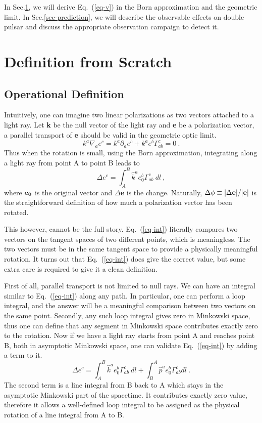 \documentclass[aps,showpacs,onecolumn,floats,prd,superscriptaddress,nofootinbib]{revtex4}
\begin{document}
In Sec.\ref{sec-born}, we will derive Eq.~(\ref{eq-v}) in the Born approximation and the geometric limit. In Sec.\ref{sec-prediction}, we will describe the observable effects on double pulsar and discuss the appropriate observation campaign to detect it.

\section{Definition from Scratch}
\label{sec-born}

\subsection{Operational Definition}

Intuitively, one can imagine two linear polarizations as two vectors attached to a light ray. Let {\bf k} be the null vector of the light ray and {\bf e} be a polarization vector, a parallel transport of {\bf e} should be valid in the geometric optic limit.
\begin{equation}
k^a \nabla_a e^c = k^a \partial_a e^c + k^a e^b \Gamma_{ab}^c =0~.
\end{equation}
Thus when the rotation is small, using the Born approximation, integrating along a light ray from point A to point B leads to
\begin{equation}
\Delta e^c = \int_A^B \hat{k}^a e_0^b \Gamma_{ab}^c~dl~,
\label{eq-int}
\end{equation}
where ${\bf e_0}$ is the original vector and $\Delta${\bf e} is the change. Naturally, $\Delta \phi \equiv |\Delta {\bf e}|/|{\bf e}|$ is the straightforward definition of how much a polarization vector has been rotated.

This however, cannot be the full story. Eq.~(\ref{eq-int}) literally compares two vectors on the tangent spaces of two different points, which is meaningless. The two vectors must be in the same tangent space to provide a physically meaningful rotation. It turns out that Eq.~(\ref{eq-int}) does give the correct value, but some extra care is required to give it a clean definition.

First of all, parallel transport is not limited to null rays. We can have an integral similar to Eq.~(\ref{eq-int}) along any path. In particular, one can perform a loop integral, and the answer will be a meaningful comparison between two vectors on the same point. Secondly, any such loop integral gives zero in Minkowski space, thus one can define that any segment in Minkowski space contributes exactly zero to the rotation. Now if we have a light ray starts from point A and reaches point B, both in asymptotic Minkowski space, one can validate Eq.~(\ref{eq-int}) by adding a term to it.
\begin{equation}
\Delta e^c = \int_A^B \hat{k}^a e_0^b \Gamma_{ab}^c~dl +
 \int_B^A \hat{p}^a e_0^b \Gamma_{ab}^c dl~.
\label{eq-loop}
\end{equation}
The second term is a line integral from B back to A which stays in the asymptotic Minkowski part of the spacetime. It contributes exactly zero value, therefore it allows a well-defined loop integral to be assigned as the physical rotation of a line integral from A to B.
\end{document}
